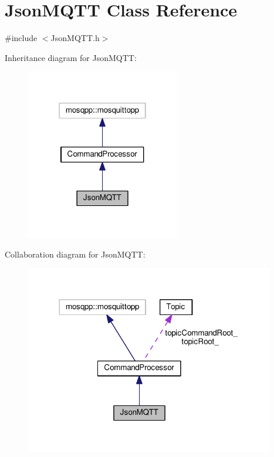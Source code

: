 \hypertarget{class_json_m_q_t_t}{}\section{Json\+M\+Q\+TT Class Reference}
\label{class_json_m_q_t_t}


{\ttfamily \#include $<$Json\+M\+Q\+T\+T.\+h$>$}



Inheritance diagram for Json\+M\+Q\+TT\+:\nopagebreak
\begin{figure}[H]
\begin{center}
\leavevmode
\includegraphics[width=190pt]{class_json_m_q_t_t__inherit__graph}
\end{center}
\end{figure}


Collaboration diagram for Json\+M\+Q\+TT\+:\nopagebreak
\begin{figure}[H]
\begin{center}
\leavevmode
\includegraphics[width=308pt]{class_json_m_q_t_t__coll__graph}
\end{center}
\end{figure}
